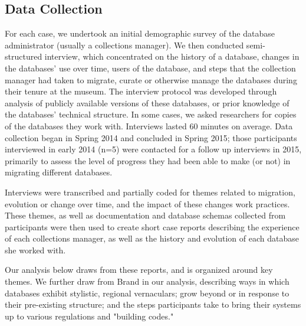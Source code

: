 \subsection{Data Collection}

For each case, we undertook an initial demographic survey of the database administrator (usually a collections manager). We then conducted semi-structured interview, which concentrated on the history of a database, changes in the databases’ use over time, users of the database, and steps that the collection manager had taken to migrate, curate or otherwise manage the databases during their tenure at the museum. The interview protocol was developed through analysis of publicly available versions of these databases, or prior knowledge of the databases’ technical structure. In some cases, we asked researchers for copies of the databases they work with. Interviews lasted 60 minutes on average. Data collection began in Spring 2014 and concluded in Spring 2015; those participants interviewed in early 2014 (n=5) were contacted for a follow up interviews in 2015, primarily to assess the level of progress they had been able to make (or not) in migrating different databases.

Interviews were transcribed and partially coded for themes related to migration, evolution or change over time, and the impact of these changes work practices. These themes, as well as documentation and database schemas collected from participants were then used to create short case reports describing the experience of each collections manager, as well as the history and evolution of each database she worked with. 

Our analysis below draws from these reports, and is organized around key themes. We further draw from Brand in our analysis, describing ways in which databases exhibit stylistic, regional vernaculars; grow beyond or in response to their pre-existing structure; and the steps participants take to bring their systems up to various regulations and "building codes."\